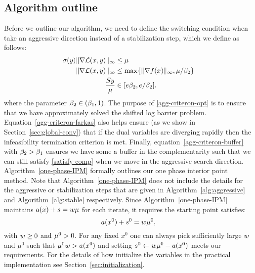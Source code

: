 \documentclass{article}
\begin{document}
\subsection{Algorithm outline}

Before we outline our algorithm, we need to define the switching condition when take an aggressive direction instead of a stabilization step, which we define as follows:
\begin{subequations}\label{agg-criteron}
\begin{flalign}
\sigma (y) \| \nabla \mathcal{L}(x, y) \|_{\infty} &\le \mu   \label{agg-criteron-opt} \\
\| \nabla \mathcal{L}(x, y) \|_{\infty} &\le  \max\{ \| \nabla f(x) \|_{\infty},  \mu / \beta_{2} \} \label{agg-criteron-farkas} \\
 \frac{S y}{\mu} &\in [ e \beta_{2}, e / \beta_{2} ]. \label{agg-criteron-buffer}
\end{flalign}
\end{subequations}
where the parameter $\beta_{2} \in (\beta_{1}, 1)$. The purpose of \eqref{agg-criteron-opt} is to ensure that we have approximately solved the shifted log barrier problem. Equation~\eqref{agg-criteron-farkas} also helps ensure (as we show in Section~\ref{sec:global-conv}) that if the dual variables are diverging rapidly then the infeasibility termination criterion is met. Finally, equation~\eqref{agg-criteron-buffer} with $\beta_{2} > \beta_{1}$ ensures we have some a buffer in the complementarity such that we can still satisfy \eqref{satisfy-comp} when we move in the aggressive search direction. Algorithm~\ref{one-phase-IPM} formally outlines our one phase interior point method. Note that Algorithm~\ref{one-phase-IPM} does not include the details for the aggressive or stabilization steps that are given in Algorithm~\ref{alg:aggressive} and Algorithm~\ref{alg:stable} respectively. Since Algorithm~\ref{one-phase-IPM} maintains $a(x) + s = w \mu$ for each iterate, it requires the starting point satisfies:
$$
a(x^{0}) + s^{0} = w \mu^{0},
$$
with $w \ge 0$ and $\mu^{0} > 0$. For any fixed $x^{0}$ one can always pick sufficiently large $w$ and $\mu^{0}$ such that $\mu^{0} w > a(x^{0})$ and setting $s^{0} \gets w \mu^{0} - a(x^{0})$ meets our requirements. For the details of how initialize the variables in the practical implementation see Section~\ref{sec:initialization}.
\end{document}
